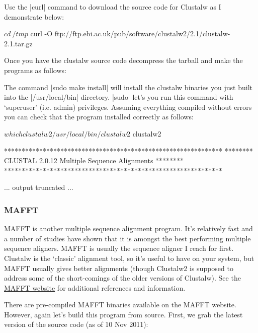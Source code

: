 \documentclass[10pt,letterpaper]{scrartcl}
\begin{document}
Use the |curl| command to download the source code for Clustalw as I demonstrate below:

\begin{Code}
$ cd ~/tmp
$ curl -O ftp://ftp.ebi.ac.uk/pub/software/clustalw2/2.1/clustalw-2.1.tar.gz 
\end{Code}
%
Once you have the clustalw source code decompress the tarball and make the programs as follows:
%
%
The command |sudo make install| will install the clustalw binaries you just built into the |/usr/local/bin| directory. |sudo| let's you run this command with `superuser' (i.e. admin) privileges.  Assuming everything compiled without errors you can check that the program installed correctly as follows:

\begin{Code}
$ which clustalw2
/usr/local/bin/clustalw2

$ clustalw2

 **************************************************************
 ******** CLUSTAL 2.0.12 Multiple Sequence Alignments  ********
 **************************************************************
 
     ... output truncated ...
\end{Code}


\subsubsection*{MAFFT}

MAFFT is another multiple sequence alignment program. It's relatively fast and a number of studies have shown that it is amongst the best performing multiple sequence aligners. MAFFT is usually the sequence aligner I reach for first.  Clustalw is the `classic' alignment tool, so it's useful to have on your system, but MAFFT usually gives better alignments (though Clustalw2 is supposed to address some of the short-comings of the older versions of Clustalw). See the \href{http://mafft.cbrc.jp/alignment/software/}{MAFFT website} for additional references and information.

There are pre-compiled MAFFT binaries available on the MAFFT website. However, again let's build this program from source. First, we grab the latest version of the source code (as of 10 Nov 2011):
\end{document}
